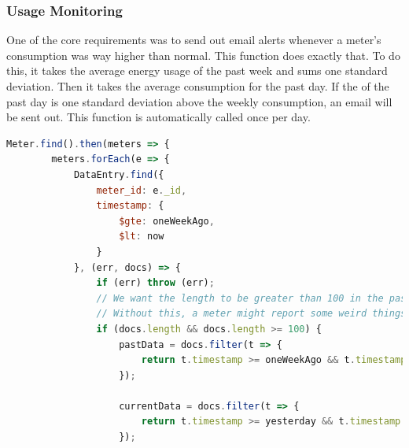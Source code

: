 \documentclass[letterpaper,10pt,serif,draftclsnofoot,onecolumn,compsoc,titlepage]{IEEEtran}
\begin{document}
\subsubsection{Usage Monitoring}
One of the core requirements was to send out email alerts whenever a meter's consumption was way higher than normal. This function does exactly that. To do this, it takes the average energy usage of the past week and sums one standard deviation. Then it takes the average consumption for the past day. If the of the past day is one standard deviation above the weekly consumption, an email will be sent out. This function is automatically called once per day.
\begin{lstlisting}[language=JavaScript]
Meter.find().then(meters => {
        meters.forEach(e => {
            DataEntry.find({
                meter_id: e._id,
                timestamp: {
                    $gte: oneWeekAgo,
                    $lt: now
                }
            }, (err, docs) => {
                if (err) throw (err);
                // We want the length to be greater than 100 in the past week (96 are entered per day)
                // Without this, a meter might report some weird things, so this forces at least two days of entries
                if (docs.length && docs.length >= 100) {
                    pastData = docs.filter(t => {
                        return t.timestamp >= oneWeekAgo && t.timestamp <= yesterday
                    });

                    currentData = docs.filter(t => {
                        return t.timestamp >= yesterday && t.timestamp <= now
                    });


\end{lstlisting}
\end{document}
